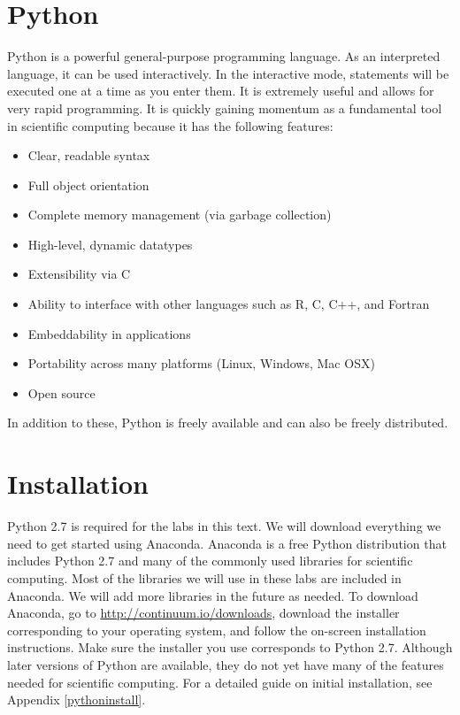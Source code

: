 \label{lab:Essential_Python}


\section*{Python}
Python is a powerful general-purpose programming language. As an interpreted
language, it can be used interactively.
In the interactive mode, statements will be executed one at a time as you enter them.
It is extremely useful and allows for very rapid programming.
It is quickly gaining momentum as a fundamental tool in scientific computing because it has the following features:
\begin{itemize}
\item Clear, readable syntax
\item Full object orientation
\item Complete memory management (via garbage collection)
\item High-level, dynamic datatypes
\item Extensibility via C
\item Ability to interface with other languages such as R, C, C++, and Fortran
\item Embeddability in applications
\item Portability across many platforms (Linux, Windows, Mac OSX)
\item Open source
\end{itemize}
In addition to these, Python is freely available and can also be freely distributed.

\section*{Installation}
Python 2.7 is required for the labs in this text. We will download everything we need to get started using Anaconda. 
Anaconda is a free Python distribution that includes Python 2.7 and many of the commonly used libraries for scientific computing. 
Most of the libraries we will use in these labs are included in Anaconda. We will add more libraries in the future as needed. 
To download Anaconda, go to \url{http://continuum.io/downloads}, download the installer corresponding to your operating system, and follow the on-screen installation instructions. 
Make sure the installer you use corresponds to Python 2.7. Although later versions of Python are available, they do not yet have many of the features needed for scientific computing. 
For a detailed guide on initial installation, see Appendix \ref{pythoninstall}. 


